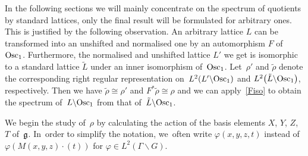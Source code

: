 \documentclass[pdftex]{sigma}
\newcommand\fg{{\frak{g}}}
\newcommand\ph{\varphi}
\newcommand{\Osc}{{\rm Osc}}
\numberwithin{equation}{section}
\begin{document}
In the following sections we will mainly concentrate on the spectrum of quotients by standard lattices, only the final result will be formulated for arbitrary ones. This is justified by the following observation. An arbitrary lattice $L$ can be transformed into an unshifted and normalised one by an automorphism $F$ of~$\Osc_1$. Furthermore, the normalised and unshifted lattice $L'$ we get is isomorphic to a standard lattice $\tilde L$ under an inner isomorphism of~$\Osc_1$. Let~$\rho'$ and $\tilde \rho$ denote the corresponding right regular representation on~$L^2(L'\backslash \Osc_1)$ and $L^2\big(\tilde L\backslash \Osc_1\big)$, respectively. Then we have $\tilde\rho\cong \rho'$ and $F^*\tilde \rho\cong\rho$
and we can apply~\eqref{Fiso} to obtain the spectrum of~$L\backslash \Osc_1$ from that of~$\tilde L\backslash \Osc_1$.

We begin the study of~$\rho$ by calculating the action of the basis elements $X$, $Y$, $Z$, $T$ of~$\fg$. In~order to simplify the notation, we~often write $\ph(x,y,z,t)$ instead of~$\ph(M(x,y,z)\cdot(t))$ for $\ph\in L^2(\Gamma\backslash G)$.
\end{document}
